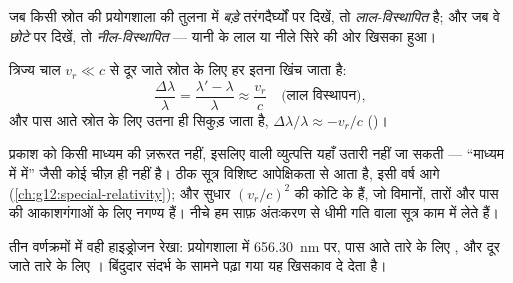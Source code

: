 \begin{definition}[लाल विस्थापन और नील विस्थापन]\label{def:g12:doppler-effect:redshift}
जब किसी स्रोत की  प्रयोगशाला की तुलना में \emph{बड़े}
तरंगदैर्घ्यों पर दिखें, तो  \emph{लाल-विस्थापित}
है; और जब वे \emph{छोटे} पर दिखें, तो \emph{नील-विस्थापित}
--- यानी  के लाल या नीले सिरे की ओर खिसका हुआ।
\end{definition}

\begin{proposition}[प्रकाश का डॉप्लर खिसकाव]\label{prop:g12:doppler-effect:light}
त्रिज्य चाल $v_r \ll c$ से दूर जाते स्रोत के लिए हर  इतना खिंच
जाता है:
\[ \frac{\Delta \lambda}{\lambda} = \frac{\lambda' - \lambda}{\lambda} \approx \frac{v_r}{c} \quad \text{(लाल विस्थापन)}, \]
और पास आते स्रोत के लिए उतना ही सिकुड़ जाता है, $\Delta\lambda/\lambda \approx -v_r/c$ ()।
\end{proposition}
\admitted

\begin{remark}[ईमानदार सूत्र कहाँ रहता है]\label{rem:g12:doppler-effect:honest}
प्रकाश को किसी माध्यम की ज़रूरत नहीं, इसलिए  वाली व्युत्पत्ति
यहाँ उतारी नहीं जा सकती --- ``माध्यम में  में'' जैसी कोई चीज़ ही नहीं है।
ठीक सूत्र विशिष्ट आपेक्षिकता से आता है, इसी वर्ष आगे (\cref{ch:g12:special-relativity}); और सुधार
$(v_r/c)^2$ की कोटि के हैं, जो विमानों, तारों और पास की आकाशगंगाओं के लिए नगण्य
हैं। नीचे हम साफ़ अंतःकरण से धीमी गति वाला सूत्र काम में लेते हैं।
\end{remark}

\begin{omfigure}

{\small तीन वर्णक्रमों में वही हाइड्रोजन रेखा: प्रयोगशाला में \qty{656.30}{nm} पर, पास
आते तारे के लिए , और दूर जाते तारे के लिए
। बिंदुदार संदर्भ के सामने पढ़ा गया यह खिसकाव
 दे देता है।}
\end{omfigure}

